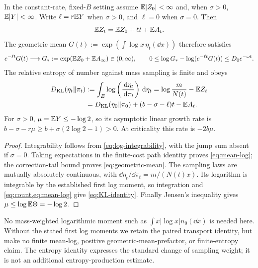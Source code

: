 \begin{proposition}\label{prop:log-means}
In the constant-rate, fixed-$B$ setting assume
$\mathbb E|Z_0|<\infty$ and, when $\sigma>0$, $\mathbb E|Y|<\infty$.
Write $\ell=r\mathbb E Y$ when $\sigma>0$, and $\ell=0$ when
$\sigma=0$. Then
\begin{equation}
 \mathbb E Z_t=\mathbb E Z_0+\ell t+\mathbb E A_t.
 \label{eq:mean-log}
\end{equation}
The geometric mean $G(t):=\exp(\int\log x\,\eta_t(\dd x))$
therefore satisfies
\begin{equation}
 e^{-\ell t}G(t)\longrightarrow
 G_*:=\exp(\mathbb E Z_0+\mathbb E A_\infty)\in(0,\infty),\qquad
 0\leq\log G_*-\log(e^{-\ell t}G(t))\leq D_0e^{-\omega t}.
 \label{eq:geometric-mean}
\end{equation}
The relative entropy of number against mass sampling is finite and
obeys
\begin{align}
 D_{\rm KL}(\eta_t\Vert\pi_t)
 &:=\int_E\log\left(\frac{\,\mathrm d\eta_t}{\,\mathrm d\pi_t}\right)\,\mathrm d\eta_t
 =\log\frac m{N(t)}-\mathbb E Z_t\notag\\
 &=D_{\rm KL}(\eta_0\Vert\pi_0)
       +(b-\sigma-\ell)t-\mathbb E A_t.
 \label{eq:KL-identity}
\end{align}
For $\sigma>0$, $\mu=\mathbb E Y\leq-\log2$, so its asymptotic linear
growth rate is
$b-\sigma-r\mu\geq b+\sigma(2\log2-1)>0$.
At criticality this rate is $-2b\mu$.
\end{proposition}

\begin{proof}
Integrability follows from \eqref{eq:log-integrability}, with the jump
sum absent if $\sigma=0$. Taking expectations in the finite-cost
path identity proves \eqref{eq:mean-log}; the correction-tail bound
proves \eqref{eq:geometric-mean}. The sampling laws are mutually
absolutely continuous, with
$\dd\eta_t/\dd\pi_t=m/(N(t)x)$. Its logarithm is integrable by
the established first log moment, so integration and
\cref{eq:count,eq:mean-log} give \eqref{eq:KL-identity}.
Finally Jensen's inequality gives
$\mu\leq\log\mathbb E\Theta=-\log2$.
\end{proof}

No mass-weighted logarithmic moment such as
$\int x|\log x|n_0(\dd x)$ is needed here. Without the stated first
log moments we retain the paired transport identity, but make no
finite mean-log, positive geometric-mean-prefactor, or finite-entropy
claim. The entropy identity expresses the standard change of sampling
weight; it is not an additional entropy-production estimate.

